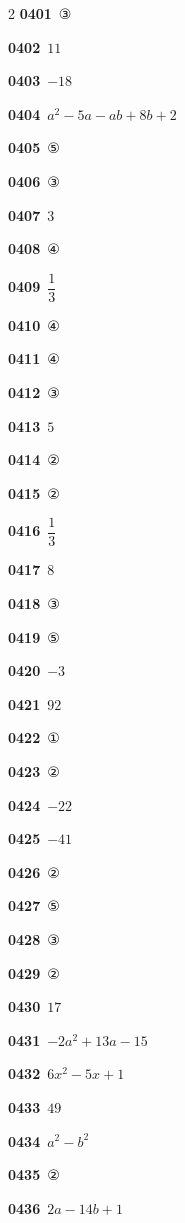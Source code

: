 \documentclass[10pt,a4paper]{article}
\begin{document}
\begin{multicols}{2}
\noindent\textbf{0401}\ ③\par
\noindent\textbf{0402}\ $11$\par
\noindent\textbf{0403}\ $-18$\par
\noindent\textbf{0404}\ $a^2-5a-ab+8b+2$\par
\noindent\textbf{0405}\ ⑤\par
\noindent\textbf{0406}\ ③\par
\noindent\textbf{0407}\ $3$\par
\noindent\textbf{0408}\ ④\par
\noindent\textbf{0409}\ $\dfrac{1}{3}$\par
\noindent\textbf{0410}\ ④\par
\noindent\textbf{0411}\ ④\par
\noindent\textbf{0412}\ ③\par
\noindent\textbf{0413}\ $5$\par
\noindent\textbf{0414}\ ②\par
\noindent\textbf{0415}\ ②\par
\noindent\textbf{0416}\ $\dfrac{1}{3}$\par
\noindent\textbf{0417}\ $8$\par
\noindent\textbf{0418}\ ③\par
\noindent\textbf{0419}\ ⑤\par
\noindent\textbf{0420}\ $-3$\par
\noindent\textbf{0421}\ $92$\par
\noindent\textbf{0422}\ ①\par
\noindent\textbf{0423}\ ②\par
\noindent\textbf{0424}\ $-22$\par
\noindent\textbf{0425}\ $-41$\par
\noindent\textbf{0426}\ ②\par
\noindent\textbf{0427}\ ⑤\par
\noindent\textbf{0428}\ ③\par
\noindent\textbf{0429}\ ②\par
\noindent\textbf{0430}\ $17$\par
\noindent\textbf{0431}\ $-2a^2+13a-15$\par
\noindent\textbf{0432}\ $6x^2-5x+1$\par
\noindent\textbf{0433}\ $49$\par
\noindent\textbf{0434}\ $a^2-b^2$\par
\noindent\textbf{0435}\ ②\par
\noindent\textbf{0436}\ $2a-14b+1$\par

\end{multicols}
\end{document}
